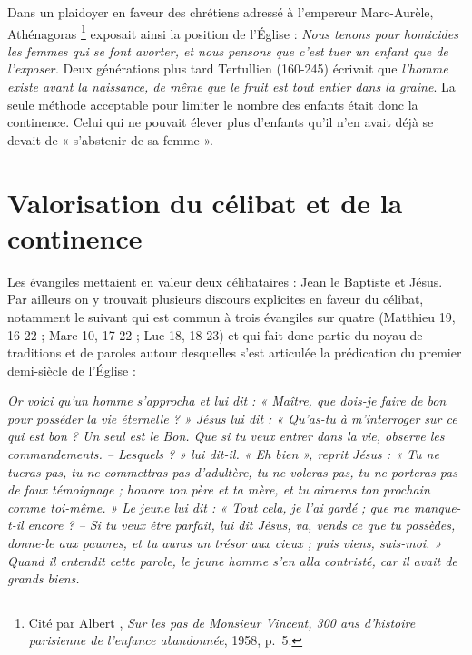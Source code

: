  Dans un plaidoyer en faveur des chrétiens adressé à l'empereur Marc-Aurèle, Athénagoras%
\footnote{Cité par Albert , \emph{Sur les pas de Monsieur Vincent, 300 ans d'histoire parisienne de l'enfance abandonnée}, 1958, p.~5.}
exposait ainsi la position de l'Église : \emph{Nous tenons pour homicides les femmes qui se font avorter, et nous pensons que c'est tuer un enfant que de l'exposer.}  Deux générations plus tard Tertullien (160-245) écrivait que \emph{l'homme existe avant la naissance, de même que le fruit est tout entier dans la graine}. La seule méthode acceptable pour limiter le nombre des enfants était donc la continence. Celui qui ne pouvait élever plus d'enfants qu'il n'en avait déjà se devait de « s'abstenir de sa femme ».


\section{Valorisation du célibat et de la continence}

 Les évangiles mettaient en valeur deux célibataires : Jean le Baptiste et Jésus. Par ailleurs on y trouvait plusieurs discours explicites en faveur du célibat, notamment le suivant qui est commun à trois évangiles sur quatre (Matthieu 19, 16-22 ; Marc 10, 17-22 ; Luc 18, 18-23) et qui fait donc partie du noyau de traditions et de paroles autour desquelles s'est articulée la prédication du premier demi-siècle de l'Église :

\begin{displayquote}[Mt~19,~16-22]
\emph{Or voici qu'un homme s'approcha et lui dit : « Maître, que dois-je faire de bon pour posséder la vie éternelle ? » Jésus lui dit : « Qu'as-tu à m'interroger sur ce qui est bon ? Un seul est le Bon. Que si tu veux entrer dans la vie, observe les commandements. -- Lesquels ? » lui dit-il. « Eh bien », reprit Jésus : « Tu ne tueras pas, tu ne commettras pas d'adultère, tu ne voleras pas, tu ne porteras pas de faux témoignage ; honore ton père et ta mère, et tu aimeras ton prochain comme toi-même. » Le jeune lui dit : « Tout cela, je l'ai gardé ; que me manque-t-il encore ? -- Si tu veux être parfait, lui dit Jésus, va, vends ce que tu possèdes, donne-le aux pauvres, et tu auras un trésor aux cieux ; puis viens, suis-moi. » Quand il entendit cette parole, le jeune homme s'en alla contristé, car il avait de grands biens.}
\end{displayquote}


